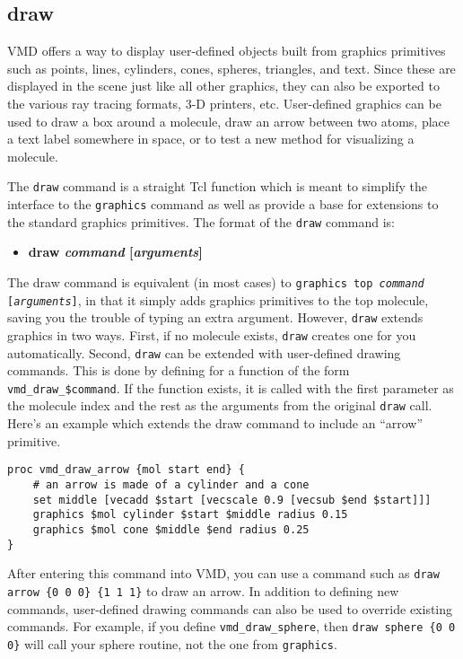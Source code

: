 \subsection{draw}
\label{ug:ui:text:draw}
VMD offers a way to display user-defined objects built from graphics
primitives such as 
points, lines, cylinders, cones, spheres, triangles, and text.  
Since these are displayed in the scene just like all other graphics, 
they can also be exported to the various ray tracing formats, 3-D printers, 
etc.
User-defined graphics can be used to draw a box around a molecule, draw
an arrow between two atoms, place a text label somewhere in space,
or to test a new method for visualizing a molecule.  

The {\tt draw} command is a straight Tcl function which is meant to
simplify the interface to the {\tt graphics} command as well as
provide a base for extensions to the standard graphics primitives.
The format of the {\tt draw} command is:
\begin{itemize}
\item {\bf draw {\it command} [{\it arguments}]}
\end{itemize}

\noindent The draw command is equivalent (in most cases) to {\tt graphics top
{\it command} [{\it arguments}]}, in that it simply adds graphics
primitives to the top molecule, saving you the trouble of typing
an extra argument.  However, {\tt draw} extends {graphics} in two ways.
First, if no molecule exists, {\tt draw} creates one for you automatically.
Second, {\tt draw} can be extended with user-defined drawing commands.
This is done by defining for a function of the form
{\tt vmd\_draw\_\$command}.  If the function exists, it is called with the
first parameter as the molecule index and the rest as the arguments from
the original {\tt draw} call.
Here's an example which extends the draw command to include an
``arrow'' primitive.

\begin{verbatim}
proc vmd_draw_arrow {mol start end} {
    # an arrow is made of a cylinder and a cone
    set middle [vecadd $start [vecscale 0.9 [vecsub $end $start]]]
    graphics $mol cylinder $start $middle radius 0.15
    graphics $mol cone $middle $end radius 0.25
}
\end{verbatim}

\noindent After entering this command into VMD, you can use a command such as
\verb!draw arrow {0 0 0} {1 1 1}! 
to draw an arrow.
In addition to defining new commands, user-defined drawing commands can also 
be used to override existing commands.  For example, if you define
{\tt vmd\_draw\_sphere}, then \verb!draw sphere {0 0 0}!
will call your sphere routine, not the one from {\tt graphics}.


